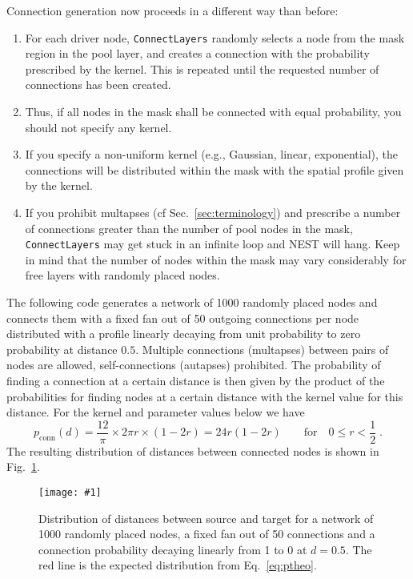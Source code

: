 \documentclass[a4paper,12pt]{report}
\newcommand{\scriptfig}[4]{%
\begin{figure}
\centerline{\texttt{[image: \#1]}}
\caption[#3]{#4}
\label{fig:#1}
\end{figure}%
}
\begin{document}
Connection generation now proceeds in a different way than before:
\begin{enumerate}
\item For each driver node, \lstinline!ConnectLayers! randomly selects
  a node from the mask region in the pool layer, and creates a
  connection with the probability prescribed by the kernel. This is
  repeated until the requested number of connections has been created.
\item Thus, if all nodes in the mask shall be connected with equal
  probability, you should not specify any kernel.
\item If you specify a non-uniform kernel (e.g., Gaussian, linear,
  exponential), the connections will be distributed within the mask
  with the spatial profile given by the kernel.
\item If you prohibit multapses (cf Sec.~\ref{sec:terminology}) and
  prescribe a number of connections greater than the number of pool nodes
  in the mask, \lstinline!ConnectLayers! may get stuck in an infinite
  loop and NEST will hang. Keep in
  mind that the number of nodes within the mask may vary considerably
  for free layers with randomly placed nodes.
\end{enumerate}

The following code generates a network of 1000 randomly placed nodes
and connects them with a fixed fan out of 50 outgoing connections per
node distributed with a profile linearly decaying from unit
probability to zero probability at distance $0.5$. Multiple
connections (multapses) between pairs of nodes are allowed,
self-connections (autapses) prohibited. The probability of finding a
connection at a certain distance is then given by the product of the
probabilities for finding nodes at a certain distance with the kernel
value for this distance. For the kernel and parameter values below we have
\begin{equation}
p_{\text{conn}}(d) = \frac{12}{\pi} \times 2\pi r \times (1-2r)
 = 24 r (1-2r) \qquad \text{for} \quad 0\le r < \frac{1}{2}\;.
\label{eq:ptheo}
\end{equation}
 The resulting
distribution of distances between connected nodes is shown in
Fig.~\ref{fig:conn6}.

\scriptfig{conn6}{0.5}{Distribution of connection distances}%
{Distribution of distances between source and target for a network of
  1000 randomly placed nodes, a fixed fan out of 50 connections and a
  connection probability decaying linearly from 1 to 0 at
  $d=0.5$. The red line is the expected distribution from Eq.~\ref{eq:ptheo}.}
\end{document}
